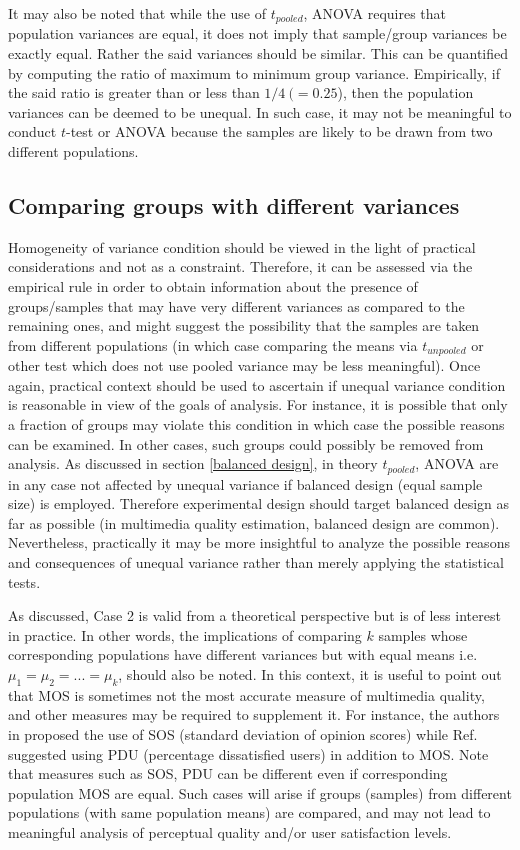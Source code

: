 \documentclass[10pt,final,Twcolumn]{IEEEtran}
\begin{document}
It may also be noted that while the use of $t_{pooled}$, ANOVA requires that population variances are equal, it does not imply that sample/group variances be exactly equal. Rather the said variances should be similar. This can be quantified by computing the ratio of maximum to minimum group variance. Empirically, if the said ratio is greater than or less than $1/4 \: (= 0.25$), then the population variances can be deemed to be unequal. In such case, it may not be meaningful to conduct $t$-test or ANOVA because the samples are likely to be drawn from two different populations. 

\subsection{Comparing groups with different variances}

Homogeneity of variance condition should be viewed in the light of practical considerations and not as a constraint. Therefore, it can be assessed via the empirical rule in order to obtain information about the presence of groups/samples that may have very different variances as compared to the remaining ones, and might suggest the possibility that the samples are taken from different populations (in which case comparing the means via $t_{unpooled}$ or other test which does not use pooled variance may be less meaningful). Once again, practical context should be used to ascertain if unequal variance condition is reasonable in view of the goals of analysis. For instance, it is possible that only a fraction of groups may violate this condition in which case the possible reasons can be examined. In other cases, such groups could possibly be removed from analysis. As discussed in section \ref{balanced design}, in theory $t_{pooled}$, ANOVA are in any case not affected by unequal variance if balanced design (equal sample size) is employed. Therefore experimental design should target balanced design as far as possible (in multimedia quality estimation, balanced design are common). Nevertheless, practically it may be more insightful to analyze the possible reasons and consequences of unequal variance rather than merely applying the statistical tests.


As discussed, Case 2 is valid from a theoretical perspective but is of less interest in practice. In other words, the implications of comparing $k$ samples whose corresponding populations have different variances but with equal means i.e. $\mu_1 = \mu_2 = ...=\mu_k$, should also be noted. In this context, it is useful to point out that MOS is sometimes not the most accurate measure of multimedia quality, and other measures may be required to supplement it. For instance, the authors in \cite{SOS} proposed the use of SOS (standard deviation of opinion scores) while Ref. \cite{PDU} suggested using PDU (percentage dissatisfied users) in addition to MOS. Note that measures such as SOS, PDU can be different even if corresponding population MOS are equal. Such cases will arise if groups (samples) from different populations (with same population means) are compared, and may not lead to meaningful analysis of perceptual quality and/or user satisfaction levels. 
\end{document}
